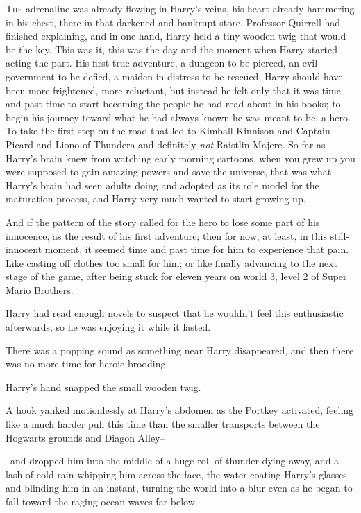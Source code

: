 
\lettrine{T}{he} adrenaline was already flowing in Harry's veins, his heart already hammering in his chest, there in that darkened and bankrupt store. Professor Quirrell had finished explaining, and in one hand, Harry held a tiny wooden twig that would be the key. This was it, this was the day and the moment when Harry started acting the part. His first true adventure, a dungeon to be pierced, an evil government to be defied, a maiden in distress to be rescued. Harry should have been more frightened, more reluctant, but instead he felt only that it was time and past time to start becoming the people he had read about in his books; to begin his journey toward what he had always known he was meant to be, a hero. To take the first step on the road that led to Kimball Kinnison and Captain Picard and Liono of Thundera and definitely \emph{not} Raistlin Majere. So far as Harry's brain knew from watching early morning cartoons, when you grew up you were supposed to gain amazing powers and save the universe, that was what Harry's brain had seen adults doing and adopted as its role model for the maturation process, and Harry very much wanted to start growing up.

And if the pattern of the story called for the hero to lose some part of his innocence, as the result of his first adventure; then for now, at least, in this still-innocent moment, it seemed time and past time for him to experience that pain. Like casting off clothes too small for him; or like finally advancing to the next stage of the game, after being stuck for eleven years on world 3, level 2 of Super Mario Brothers.

Harry had read enough novels to suspect that he wouldn't feel this enthusiastic afterwards, so he was enjoying it while it lasted.

There was a popping sound as something near Harry disappeared, and then there was no more time for heroic brooding.

Harry's hand snapped the small wooden twig.

A hook yanked motionlessly at Harry's abdomen as the Portkey activated, feeling like a much harder pull this time than the smaller transports between the Hogwarts grounds and Diagon Alley\---

\---and dropped him into the middle of a huge roll of thunder dying away, and a lash of cold rain whipping him across the face, the water coating Harry's glasses and blinding him in an instant, turning the world into a blur even as he began to fall toward the raging ocean waves far below.

